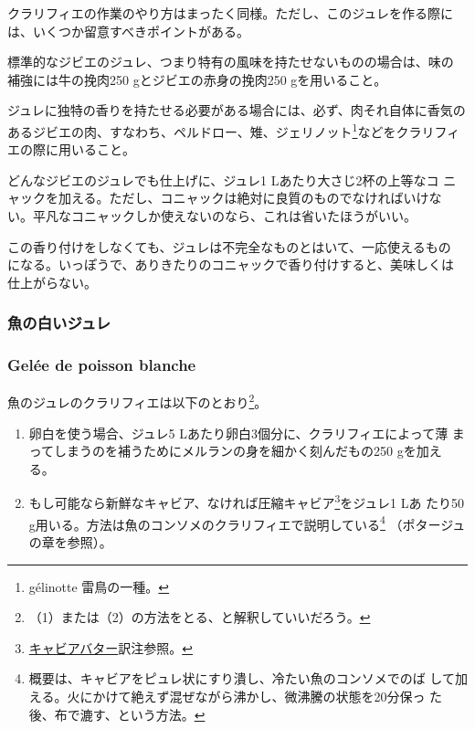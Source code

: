 \begin{recette}
クラリフィエの作業のやり方はまったく同様。ただし、このジュレを作る際に
は、いくつか留意すべきポイントがある。

標準的なジビエのジュレ、つまり特有の風味を持たせないものの場合は、味の
補強には牛の挽肉250 gとジビエの赤身の挽肉250 gを用いること。

ジュレに独特の香りを持たせる必要がある場合には、必ず、肉それ自体に香気のあるジビエの肉、すなわち、ペルドロー、雉、ジェリノット\footnote{gélinotte
  雷鳥の一種。}などをクラリフィエの際に用いること。

どんなジビエのジュレでも仕上げに、ジュレ1 Lあたり大さじ2杯の上等なコ
ニャックを加える。ただし、コニャックは絶対に良質のものでなければいけな
い。平凡なコニャックしか使えないのなら、これは省いたほうがいい。

この香り付けをしなくても、ジュレは不完全なものとはいて、一応使えるもの
になる。いっぽうで、ありきたりのコニャックで香り付けすると、美味しくは
仕上がらない。

\maeaki

\hypertarget{ux9b5aux306eux767dux3044ux30b8ux30e5ux30ec}{%
\subsubsection{魚の白いジュレ}\label{ux9b5aux306eux767dux3044ux30b8ux30e5ux30ec}}

\hypertarget{gelee-de-poisson-blanche}{%
\subsubsection{Gelée de poisson
blanche}\label{gelee-de-poisson-blanche}}


魚のジュレのクラリフィエは以下のとおり\footnote{（1）または（2）の方法をとる、と解釈していいだろう。}。

\begin{enumerate}
\def\labelenumi{\arabic{enumi}.}
\item
  卵白を使う場合、ジュレ5 Lあたり卵白3個分に、クラリフィエによって薄
  まってしまうのを補うためにメルランの身を細かく刻んだもの250 gを加え
  る。
\item
  もし可能なら新鮮なキャビア、なければ圧縮キャビア\footnote{\protect\hyperlink{beurre-de-caviar}{キャビアバター}訳注参照。}をジュレ1
  Lあ たり50
  g用いる。方法は魚のコンソメのクラリフィエで説明している\footnote{概要は、キャビアをピュレ状にすり潰し、冷たい魚のコンソメでのば
    して加える。火にかけて絶えず混ぜながら沸かし、微沸騰の状態を20分保っ
    た後、布で漉す、という方法。} （ポタージュの章を参照）。
\end{enumerate}


\end{recette}
